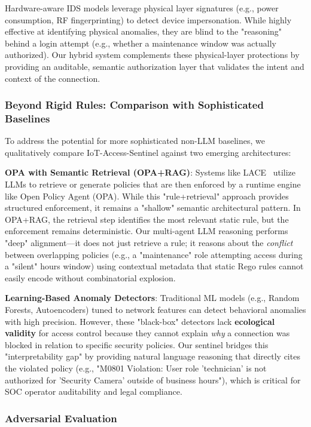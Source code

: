 \documentclass[conference]{IEEEtran}
\begin{document}
Hardware-aware IDS models leverage physical layer signatures (e.g., power consumption, RF fingerprinting) to detect device impersonation. While highly effective at identifying physical anomalies, they are blind to the "reasoning" behind a login attempt (e.g., whether a maintenance window was actually authorized). Our hybrid system complements these physical-layer protections by providing an auditable, semantic authorization layer that validates the intent and context of the connection.

\subsubsection{Beyond Rigid Rules: Comparison with Sophisticated Baselines}

To address the potential for more sophisticated non-LLM baselines, we qualitatively compare IoT-Access-Sentinel against two emerging architectures:

\textbf{OPA with Semantic Retrieval (OPA+RAG)}: Systems like LACE~\cite{lace2025} utilize LLMs to retrieve or generate policies that are then enforced by a runtime engine like Open Policy Agent (OPA). While this "rule+retrieval" approach provides structured enforcement, it remains a "shallow" semantic architectural pattern. In OPA+RAG, the retrieval step identifies the most relevant static rule, but the enforcement remains deterministic. Our multi-agent LLM reasoning performs "deep" alignment—it does not just retrieve a rule; it reasons about the \textit{conflict} between overlapping policies (e.g., a "maintenance" role attempting access during a "silent" hours window) using contextual metadata that static Rego rules cannot easily encode without combinatorial explosion.

\textbf{Learning-Based Anomaly Detectors}: Traditional ML models (e.g., Random Forests, Autoencoders) tuned to network features can detect behavioral anomalies with high precision. However, these "black-box" detectors lack \textbf{ecological validity} for access control because they cannot explain \textit{why} a connection was blocked in relation to specific security policies. Our sentinel bridges this "interpretability gap" by providing natural language reasoning that directly cites the violated policy (e.g., "M0801 Violation: User role 'technician' is not authorized for 'Security Camera' outside of business hours"), which is critical for SOC operator auditability and legal compliance.

\subsubsection{Adversarial Evaluation}
\end{document}
